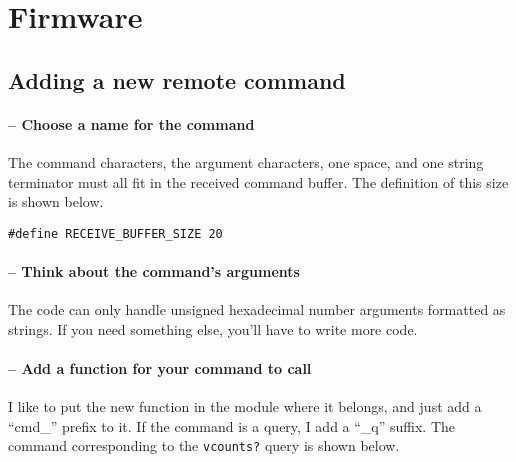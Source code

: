 \section{Firmware}


\subsection{Adding a new remote command}

\setcounter{comcount}{1}
\paragraph{ --  Choose a name for the command}
The command characters, the argument characters, one space, and one
string terminator must all fit in the received command buffer. The
definition of this size is shown below.

{ \texttt{\#define RECEIVE\_BUFFER\_SIZE 20} }

\addtocounter{comcount}{1}
\paragraph{ -- Think about the command's arguments}
The code can only handle unsigned hexadecimal number arguments
formatted as strings.  If you need something else, you'll have to
write more code.

\addtocounter{comcount}{1}
\paragraph{ -- Add a function for your command to call}
I like to put the new function in the module where it belongs, and
just add a ``cmd\_'' prefix to it.  If the command is a query, I add a
``\_q'' suffix.  The command corresponding to the \texttt{vcounts?}
query is shown below.

